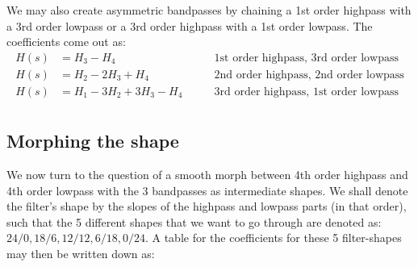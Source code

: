 We may also create asymmetric bandpasses by chaining a 1st order highpass with a 3rd order lowpass or a 3rd order highpass with a 1st order lowpass. The coefficients come out as:
\begin{equation}
 \boxed
 {
  \begin{aligned}
   H(s) &= H_3 - H_4                         \qquad & \text{1st order highpass, 3rd order lowpass} \\ 
   H(s) &= H_2 - 2 H_3 + H_4                 \qquad & \text{2nd order highpass, 2nd order lowpass} \\
   H(s) &= H_1 - 3 H_2 + 3 H_3 - H_4         \qquad & \text{3rd order highpass, 1st order lowpass} \\ 
  \end{aligned}
 }
\end{equation}

\subsection{Morphing the shape}
We now turn to the question of a smooth morph between 4th order highpass and 4th order lowpass with the 3 bandpasses as intermediate shapes. We shall denote the filter's shape by the slopes of the highpass and lowpass parts (in that order), such that the 5 different shapes that we want to go through are denoted as: $24/0, 18/6, 12/12, 6/18, 0/24$. A table for the coefficients for these 5 filter-shapes may then be written down as:






